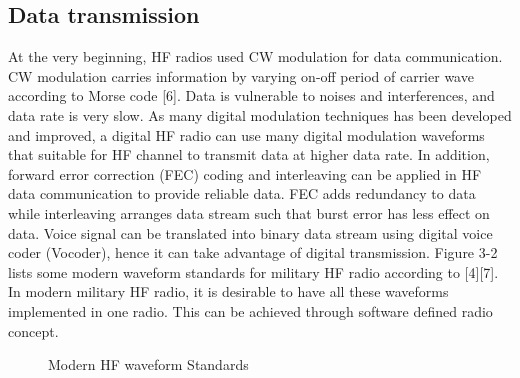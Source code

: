 \documentclass[conference]{IEEEtran}
\begin{document}
\subsection{Data transmission}
At the very beginning, HF radios used CW modulation for data communication. CW modulation carries information by varying on-off period of carrier wave according to Morse code [6]. Data is vulnerable to noises and interferences, and data rate is very slow. As many digital modulation techniques has been developed and improved, a digital HF radio can use many digital modulation waveforms that suitable for HF channel to transmit data at higher data rate. In addition, forward error correction (FEC) coding and interleaving can be applied in HF data communication to provide reliable data. FEC adds redundancy to data while interleaving arranges data stream such that burst error has less effect on data. Voice signal can be translated into binary data stream using digital voice coder (Vocoder), hence it can take advantage of digital transmission. Figure 3-2 lists some modern waveform standards for military HF radio according to [4][7]. In modern military HF radio, it is desirable to have all these waveforms implemented in one radio. This can be achieved through software defined radio concept.
\begin{figure}[h!]
	\centering
	\caption{Modern HF waveform Standards}
\end{figure}
\end{document}
